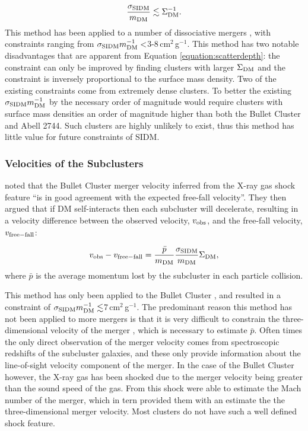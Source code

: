 \begin{equation}\label{equation:scatterdepth}
\frac{\sigma_{\rm SIDM}}{m_{\rm DM}} \lesssim \Sigma_{\rm DM}^{-1}.
\end{equation}
This method has been applied to a number of dissociative mergers \citep{Markevitch:2004dl, Dawson:2012dl, Merten:2011gu}, with constraints ranging from $\sigma_{\rm SIDM}m^{-1}_{\rm DM} <$3-8\,cm$^2$\,g$^{-1}$.
This method has two notable disadvantages that are apparent from Equation \ref{equation:scatterdepth}: the constraint can only be improved by finding clusters with larger $\Sigma_{\rm DM}$ and the constraint is inversely proportional to the surface mass density.
Two of the existing constraints \citep{Markevitch:2004dl, Merten:2011gu} come from extremely dense clusters.
To better the existing $\sigma_{\rm SIDM}m^{-1}_{\rm DM}$ by the necessary order of magnitude would require clusters with surface mass densities an order of magnitude higher than both the Bullet Cluster and Abell 2744.
Such clusters are highly unlikely to exist, thus this method has little value for future constraints of SIDM.
 
\subsubsection{Velocities of the Subclusters} 
 
\citet{Markevitch:2004dl} noted that the Bullet Cluster merger velocity inferred from the X-ray gas shock feature ``is in good agreement with the expected free-fall velocity''.
They then argued that if DM self-interacts then each subcluster will decelerate, resulting in a velocity difference between the observed velocity, $v_{\rm obs}$, and the free-fall velocity, $v_{\rm free-fall}$:

\begin{displaymath}
v_{\rm obs} - v_{\rm free-fall} = \frac{\bar{p}}{m_{\rm DM}}\frac{\sigma_{\rm SIDM}}{m_{\rm DM}} \Sigma_{\rm DM},
\end{displaymath}
where $\bar{p}$ is the average momentum lost by the subcluster in each particle collision.

This method has only been applied to the Bullet Cluster \citep{Markevitch:2004dl}, and resulted in a constraint of $\sigma_{\rm SIDM}m^{-1}_{\rm DM} \lesssim$7\,cm$^2$\,g$^{-1}$.
The predominant reason this method has not been applied to more mergers is that it is very difficult to constrain the three-dimensional velocity of the merger \citep{Dawson:2012ub}, which is necessary to estimate $\bar{p}$.
Often times the only direct observation of the merger velocity comes from spectroscopic redshifts of the subcluster galaxies, and these only provide information about the line-of-sight velocity component of the merger.
In the case of the Bullet Cluster however, the X-ray gas has been shocked due to the merger velocity being greater than the sound speed of the gas.
From this shock \citet{Markevitch:2002iz} were able to estimate the Mach number of the merger, which in tern provided them with an estimate the the three-dimensional merger velocity.
Most clusters do not have such a well defined shock feature.

